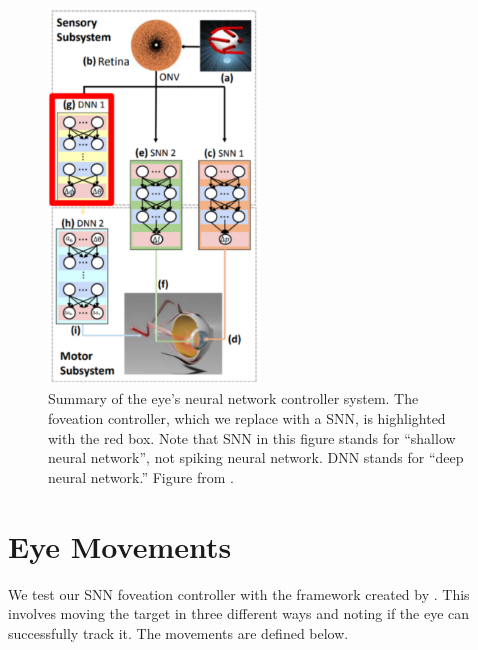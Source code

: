 \documentclass [MS] {UCLAthesis}
\begin{document}
\begin{figure}
    \centering
    \includegraphics[width=0.5\textwidth]{subsystem_summary2}
    \caption[Summary of existing oculomotor system controlled by neural networks]{Summary of the eye's neural network controller system. The foveation controller, which we replace with a SNN, is highlighted with the red box. Note that SNN in this figure stands for ``shallow neural network'', not spiking neural network. DNN stands for ``deep neural network.'' Figure from \citep{Arjun}. }
    \label{fig:eye controller summary}
\end{figure}


\section{Eye Movements}

We test our SNN foveation controller with the framework created by \citet{Arjun}. This involves moving the target in three different ways and noting if the eye can successfully track it. The movements are defined below.
\end{document}
